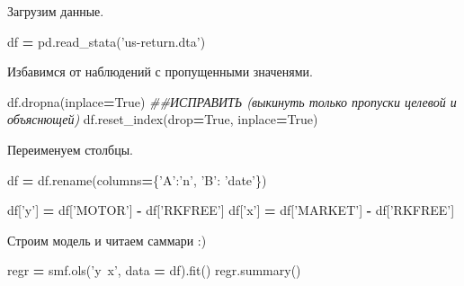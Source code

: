\documentclass[]{book}
\newenvironment{Shaded}{\begin{snugshade}}{\end{snugshade}}
\newcommand{\CommentTok}[1]{\textcolor[rgb]{0.56,0.35,0.01}{\textit{#1}}}
\newcommand{\NormalTok}[1]{#1}
\newcommand{\OperatorTok}[1]{\textcolor[rgb]{0.81,0.36,0.00}{\textbf{#1}}}
\newcommand{\StringTok}[1]{\textcolor[rgb]{0.31,0.60,0.02}{#1}}
\newcommand{\VariableTok}[1]{\textcolor[rgb]{0.00,0.00,0.00}{#1}}
\begin{document}
Загрузим данные.

\begin{Shaded}
\begin{Highlighting}[]
\NormalTok{df }\OperatorTok{=}\NormalTok{ pd.read_stata(}\StringTok{'us-return.dta'}\NormalTok{)}
\end{Highlighting}
\end{Shaded}

Избавимся от наблюдений с пропущенными значенями.

\begin{Shaded}
\begin{Highlighting}[]
\NormalTok{df.dropna(inplace}\OperatorTok{=}\VariableTok{True}\NormalTok{) }\CommentTok{##ИСПРАВИТЬ (выкинуть только пропуски целевой и объяснющей)}
\NormalTok{df.reset_index(drop}\OperatorTok{=}\VariableTok{True}\NormalTok{, inplace}\OperatorTok{=}\VariableTok{True}\NormalTok{)}
\end{Highlighting}
\end{Shaded}

Переименуем столбцы.

\begin{Shaded}
\begin{Highlighting}[]
\NormalTok{df }\OperatorTok{=}\NormalTok{ df.rename(columns}\OperatorTok{=}\NormalTok{\{}\StringTok{'A'}\NormalTok{:}\StringTok{'n'}\NormalTok{, }\StringTok{'B'}\NormalTok{: }\StringTok{'date'}\NormalTok{\})}
\end{Highlighting}
\end{Shaded}

\begin{Shaded}
\begin{Highlighting}[]
\NormalTok{df[}\StringTok{'y'}\NormalTok{] }\OperatorTok{=}\NormalTok{ df[}\StringTok{'MOTOR'}\NormalTok{] }\OperatorTok{-}\NormalTok{ df[}\StringTok{'RKFREE'}\NormalTok{]}
\NormalTok{df[}\StringTok{'x'}\NormalTok{] }\OperatorTok{=}\NormalTok{ df[}\StringTok{'MARKET'}\NormalTok{] }\OperatorTok{-}\NormalTok{ df[}\StringTok{'RKFREE'}\NormalTok{] }
\end{Highlighting}
\end{Shaded}

Строим модель и читаем саммари :)

\begin{Shaded}
\begin{Highlighting}[]
\NormalTok{regr }\OperatorTok{=}\NormalTok{ smf.ols(}\StringTok{'y~x'}\NormalTok{, data }\OperatorTok{=}\NormalTok{ df).fit()}
\NormalTok{regr.summary()}
\end{Highlighting}
\end{Shaded}
\end{document}
